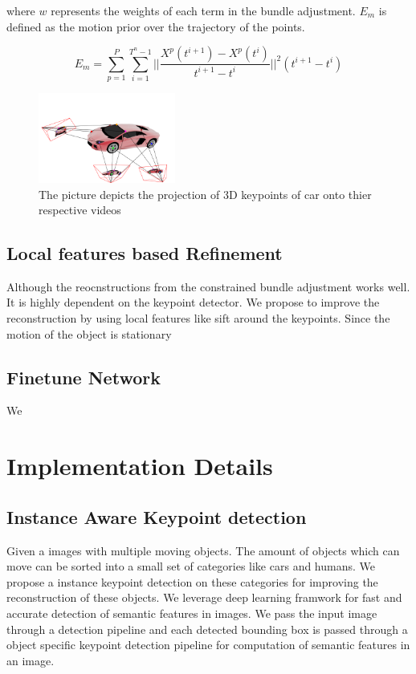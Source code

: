 \documentclass[10pt,twocolumn,letterpaper]{article}
\begin{document}
where $w$ represents the weights of each term in the bundle adjustment. $E_m$ is defined as the motion prior over the trajectory of the points.

\begin{equation}
E_m = \sum_{p =1 }^P \sum_{i = 1}^{T^n -1} ||\frac{X^p(t^{i+1}) - X^p(t^{i})}{t^{i+1} - t^{i}}||^2 (t^{i+1} - t^{i})
\end{equation}
\begin{figure}
  \centering
    \includegraphics[width=0.4\textwidth]{images/corr}
  \caption{The picture depicts the projection of 3D keypoints of car onto thier respective videos}
  \label{fig:corr}
\end{figure}

\subsection{Local features based Refinement}
Although the reocnstructions from the constrained bundle adjustment works well. It is highly dependent on the keypoint detector. We propose to improve the reconstruction by using local features like sift around the keypoints. Since the motion of the object is stationary 
\subsection{Finetune Network}
We 
\section{Implementation Details}

\subsection{Instance Aware Keypoint detection}
Given a images with multiple moving objects. The amount of objects which can move can be sorted into a small set of categories like cars and humans. We propose a instance keypoint detection on these categories for improving the reconstruction of these objects. We leverage deep learning framwork for fast and accurate detection of semantic features in images. We pass the input image through a detection pipeline and each detected bounding box is passed through a object specific keypoint detection pipeline for computation of semantic features in an image.  
\end{document}
